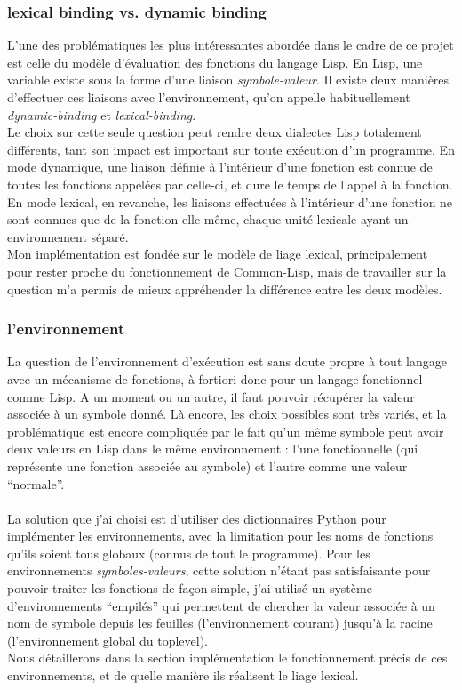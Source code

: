 \documentclass{article}
\begin{document}
\subsubsection{lexical binding vs. dynamic binding}
L'une des problématiques les plus intéressantes abordée dans le cadre de ce projet est celle du modèle d'évaluation 
des fonctions du langage Lisp. En Lisp, une variable existe sous la forme d'une liaison \emph{symbole-valeur}. 
Il existe deux manières d'effectuer ces liaisons avec l'environnement, 
qu'on appelle habituellement \emph{dynamic-binding} et \emph{lexical-binding}.
\\
Le choix sur cette seule question peut rendre deux dialectes Lisp totalement différents, tant son impact est important 
sur toute exécution d'un programme. En mode dynamique, une liaison définie à l'intérieur d'une fonction est connue de toutes
les fonctions appelées par celle-ci, et dure le temps de l'appel à la fonction. En mode lexical, en revanche, les liaisons 
effectuées à l'intérieur d'une fonction ne sont connues que de la fonction elle même, 
chaque unité lexicale ayant un environnement séparé.
\\
Mon implémentation est fondée sur le modèle de liage lexical, principalement pour rester proche du fonctionnement de Common-Lisp, 
mais de travailler sur la question m'a permis de mieux appréhender la différence entre les deux modèles.
\subsubsection{l'environnement}
La question de l'environnement d'exécution est sans doute propre à tout langage avec un
mécanisme de fonctions, à fortiori donc pour un langage fonctionnel comme Lisp. A un moment ou 
un autre, il faut pouvoir récupérer la valeur associée à un symbole donné. Là encore, les choix 
possibles sont très variés, et la problématique est encore compliquée par le fait qu'un même symbole
peut avoir deux valeurs en Lisp dans le même environnement : l'une fonctionnelle (qui représente une fonction
associée au symbole) et l'autre comme une valeur ``normale''.
\paragraph{}
La solution que j'ai choisi est d'utiliser des dictionnaires Python pour implémenter les environnements, avec la 
limitation pour les noms de fonctions qu'ils soient tous globaux (connus de tout le programme). Pour les environnements
\emph{symboles-valeurs}, cette solution n'étant pas satisfaisante pour pouvoir traiter les fonctions de façon simple, 
j'ai utilisé un système d'environnements ``empilés'' qui permettent de chercher la valeur associée à un nom de symbole
depuis les feuilles (l'environnement courant) jusqu'à la racine (l'environnement global du toplevel).
\\
Nous détaillerons dans la section implémentation le fonctionnement précis de ces environnements, 
et de quelle manière ils réalisent le liage lexical.
\end{document}
